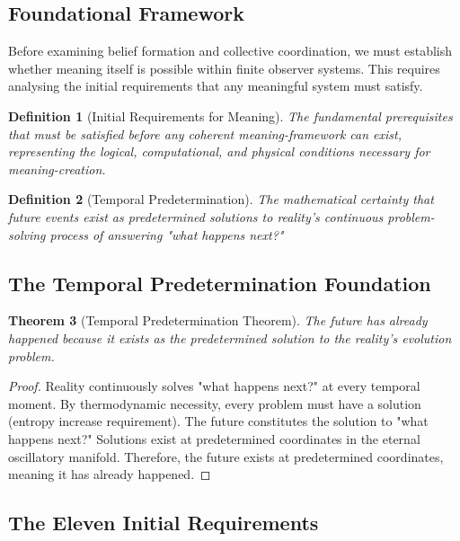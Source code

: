 \documentclass[12pt,a4paper]{article}
\newtheorem{theorem}{Theorem}[section]
\newtheorem{definition}[theorem]{Definition}
\begin{document}
\subsection{Foundational Framework}

Before examining belief formation and collective coordination, we must establish whether meaning itself is possible within finite observer systems. This requires analysing the initial requirements that any meaningful system must satisfy.

\begin{definition}[Initial Requirements for Meaning]
The fundamental prerequisites that must be satisfied before any coherent meaning-framework can exist, representing the logical, computational, and physical conditions necessary for meaning-creation.
\end{definition}

\begin{definition}[Temporal Predetermination]
The mathematical certainty that future events exist as predetermined solutions to reality's continuous problem-solving process of answering "what happens next?"
\end{definition}

\subsection{The Temporal Predetermination Foundation}

\begin{theorem}[Temporal Predetermination Theorem]
The future has already happened because it exists as the predetermined solution to the reality's evolution problem.
\end{theorem}

\begin{proof}
Reality continuously solves "what happens next?" at every temporal moment. By thermodynamic necessity, every problem must have a solution (entropy increase requirement). The future constitutes the solution to "what happens next?" Solutions exist at predetermined coordinates in the eternal oscillatory manifold. Therefore, the future exists at predetermined coordinates, meaning it has already happened.
\end{proof}

\subsection{The Eleven Initial Requirements}
\end{document}
